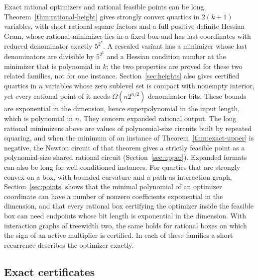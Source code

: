 Exact rational optimizers and rational feasible points can be long.
Theorem~\ref{thm:rational-height} gives strongly convex quartics in
$2(k+1)$ variables, with short rational square factors and a full positive
definite Hessian Gram, whose rational minimizer lies in a fixed box and has
last coordinates with reduced denominator exactly $5^{2^k}$. A rescaled
variant has a minimizer whose last denominators are divisible by $5^{2^k}$
and a Hessian condition number at the minimizer that is polynomial in $k$;
the two properties are proved for these two related families, not for one
instance. Section~\ref{sec:heights} also gives certified quartics
in $n$ variables whose zero sublevel set is compact with nonempty interior,
yet every rational point of it needs $\Omega(n2^{n/2})$ denominator bits.
These bounds are exponential in the dimension, hence superpolynomial in the
input length, which is polynomial in $n$. They concern expanded rational
output. The long rational minimizers above are values of polynomial-size
circuits built by repeated squaring, and when the minimum of an instance of
Theorem~\ref{thm:exact-upper} is negative, the Newton circuit of that theorem
gives a strictly feasible point as a polynomial-size shared rational circuit
(Section~\ref{sec:upper}). Expanded formats can also be long for
well-conditioned instances. For quartics that are strongly convex on a box,
with bounded curvature and a path as interaction graph,
Section~\ref{sec:points} shows that the minimal polynomial of an optimizer
coordinate can have a number of nonzero coefficients exponential in the
dimension, and that every rational box certifying the optimizer inside the
feasible box can need endpoints whose bit length is exponential in the
dimension. With interaction graphs of treewidth two, the same holds for
rational boxes on which the sign of an active multiplier is certified. In each
of these families a short recurrence describes the optimizer exactly.

\subsection{Exact certificates}
\label{sec:intro-certificates}

